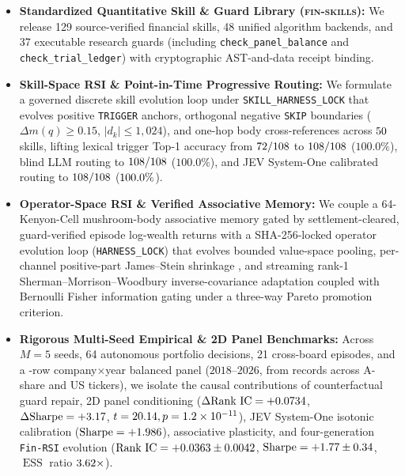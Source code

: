 \documentclass[11pt]{article}
\begin{document}
\begin{itemize}
\item \textbf{Standardized Quantitative Skill \& Guard Library (\textsc{fin-skills}):} We release
129 source-verified financial skills, 48 unified algorithm backends, and 37 executable
research guards (including \texttt{check\_panel\_balance} and \texttt{check\_trial\_ledger}) with
cryptographic AST-and-data receipt binding.
\item \textbf{Skill-Space RSI \& Point-in-Time Progressive Routing:} We formulate a governed
discrete skill evolution loop under \texttt{SKILL\_HARNESS\_LOCK} that evolves positive
\texttt{TRIGGER} anchors, orthogonal negative \texttt{SKIP} boundaries ($\Delta m(q) \ge 0.15$,
$|d_k| \le 1{,}024$), and one-hop body cross-references across $50{}$ skills,
lifting lexical trigger Top-1 accuracy from $72{}/108$ to
$108{}/108$ ($100.0\%$), blind LLM routing to
$108{}/108$ ($100.0\%$), and JEV System-One calibrated routing to
$108{}/108$ ($100.0{}\%$).
\item \textbf{Operator-Space RSI \& Verified Associative Memory:} We couple a 64-Kenyon-Cell
mushroom-body associative memory gated by settlement-cleared, guard-verified episode
log-wealth returns with a SHA-256-locked operator evolution loop (\texttt{HARNESS\_LOCK}) that
evolves bounded value-space pooling, per-channel positive-part James--Stein shrinkage
\cite{james1961estimation}, and streaming rank-1 Sherman--Morrison--Woodbury inverse-covariance
adaptation \cite{sherman1950adjustment} coupled with Bernoulli Fisher information gating under a
three-way Pareto promotion criterion.
\item \textbf{Rigorous Multi-Seed Empirical \& 2D Panel Benchmarks:} Across $M=5$ seeds, 64
autonomous portfolio decisions, 21 cross-board episodes, and a \PanelBalancedRows{}-row
company$\times$year balanced panel ($2018\text{--}2026$, from \CorpusTotalRecords{} records across
\CorpusAnnounceTickers{} A-share and \CorpusStockTwitsTickers{} US tickers), we isolate the causal
contributions of counterfactual guard repair, 2D panel conditioning ($\Delta\text{Rank IC} = +0.0734{}$,
$\Delta\text{Sharpe} = +3.17{}$, $t = 20.14{}, p = 1.2\times 10^{-11}{}$),
JEV System-One isotonic calibration ($\text{Sharpe} = +1.986{}$), associative plasticity, and
four-generation \texttt{Fin-RSI} evolution ($\text{Rank IC} = +0.0363{} \pm 0.0042{}$,
$\text{Sharpe} = +1.77{} \pm 0.34{}$, $\operatorname{ESS}$ ratio $3.62{}\times$).
\end{itemize}
\end{document}
